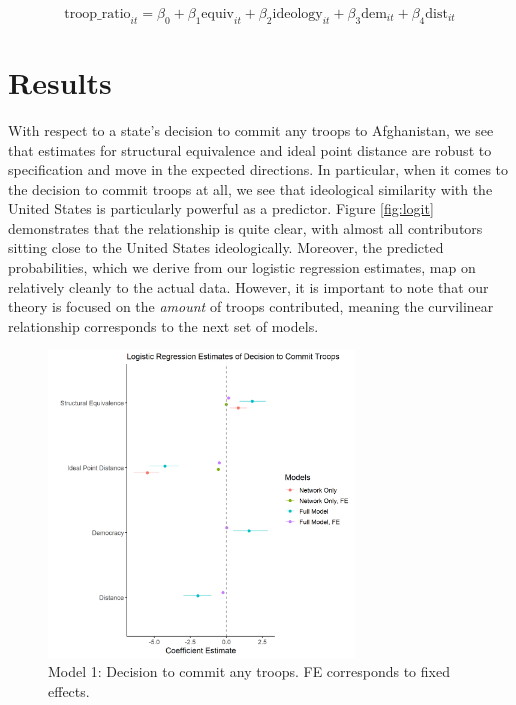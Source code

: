 \documentclass[12pt,letterpaper]{article}
\begin{document}
			\vspace{-2em}
			\begin{equation*}
				\text{troop\_ratio}_{it} = \beta_0 + \beta_1\text{equiv}_{it} +
				\beta_2\text{ideology}_{it} + \beta_3\text{dem}_{it} + \beta_4\text{dist}_{it}
			\end{equation*}

\section{Results}
	With respect to a state's decision to commit any troops to Afghanistan, we see that estimates for structural equivalence and ideal point distance are robust to specification and move in the expected directions. In particular, when it comes to the decision to commit troops at all, we see that ideological similarity with the United States is particularly powerful as a predictor. Figure \ref{fig:logit} demonstrates that the relationship is quite clear, with almost all contributors sitting close to the United States ideologically. Moreover, the predicted probabilities, which we derive from our logistic regression estimates, map on relatively cleanly to the actual data. However, it is important to note that our theory is focused on the \textit{amount} of troops contributed, meaning the curvilinear relationship corresponds to the next set of models.

	\begin{figure}[H]
		\centering
		\includegraphics[width=0.725\textwidth]{logit_coef.png}
		\caption{Model 1: Decision to commit any troops. FE corresponds to fixed effects.}
		\label{fig:logit_reg}
	\end{figure}
	
\end{document}
